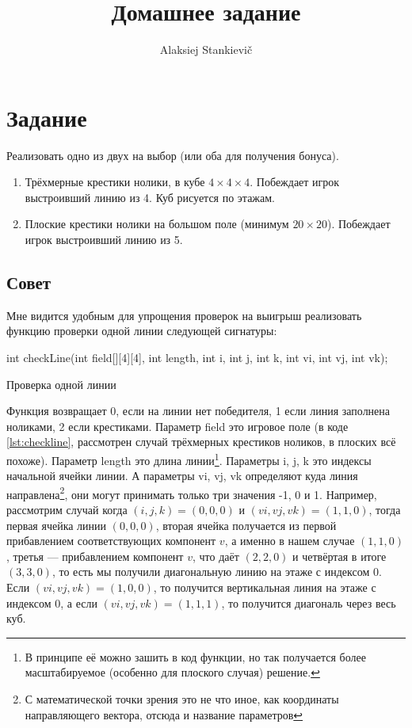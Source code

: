 \documentclass[12pt]{article}
\author{Alaksiej Stankievič}
\title{Домашнее задание}
\begin{document}

\section{Задание}

Реализовать одно из двух на выбор (или оба для получения бонуса).

\begin{enumerate}
 \item Трёхмерные крестики нолики, в кубе $4\times 4 \times 4$. Побеждает игрок выстроивший линию из 4. Куб рисуется по этажам.
 \item Плоские крестики нолики на большом поле (минимум $20 \times 20$). Побеждает игрок выстроивший линию из 5.
\end{enumerate}

\subsection{Совет}
Мне видится удобным для упрощения проверок на выигрыш реализовать функцию проверки одной линии следующей сигнатуры:
\begin{listing}[H]
\begin{center}
\begin{ccode}
int checkLine(int field[][4][4], int length, int i, int j, int k, 
                int vi, int vj, int vk);
\end{ccode}
\end{center}
\caption{Проверка одной линии}
\label{lst:checkline}
\end{listing} 
Функция возвращает 0, если на линии нет победителя, 1 если линия заполнена ноликами, 2 если крестиками. Параметр field это игровое поле (в коде \ref{lst:checkline}, рассмотрен случай трёхмерных крестиков ноликов, в плоских всё похоже). Параметр length это длина линии\footnote{В принципе её можно зашить в код функции, но так получается более масштабируемое (особенно для плоского случая) решение.}. Параметры i, j, k это индексы начальной ячейки линии. А параметры vi, vj, vk определяют куда линия направлена\footnote{С математической точки зрения это не что иное, как координаты направляющего вектора, отсюда и название параметров}, они могут принимать только три значения -1, 0 и 1. Например, рассмотрим случай когда $(i, j, k) = (0, 0, 0)$ и $(vi, vj, vk) = (1, 1, 0)$, тогда первая ячейка линии $(0, 0, 0)$, вторая ячейка получается из первой прибавлением соответствующих компонент $v$, а именно в нашем случае $(1, 1, 0)$, третья --- прибавлением компонент $v$, что даёт $(2, 2, 0)$ и четвёртая в итоге $(3, 3, 0)$, то есть мы получили диагональную линию на этаже с индексом 0. Если $(vi, vj, vk) = (1, 0, 0)$, то получится вертикальная линия на этаже с индексом 0, а если $(vi, vj, vk) = (1, 1, 1)$, то получится диагональ через весь куб.
\end{document}
